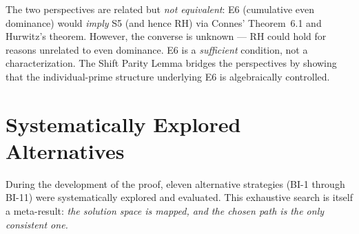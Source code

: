\documentclass[12pt,a4paper]{article}
\theoremstyle{definition}
\theoremstyle{remark}
\begin{document}
\begin{center}
\renewcommand{\arraystretch}{1.2}
\end{center}

\noindent The two perspectives are related but \emph{not equivalent}: E6 (cumulative even dominance) would \emph{imply} S5 (and hence RH) via Connes' Theorem~6.1 and Hurwitz's theorem. However, the converse is unknown --- RH could hold for reasons unrelated to even dominance. E6 is a \emph{sufficient} condition, not a characterization. The Shift Parity Lemma bridges the perspectives by showing that the individual-prime structure underlying E6 is algebraically controlled.


\needspace{8cm}
\section{Systematically Explored Alternatives}
\label{sec:explored-alternatives}

During the development of the proof, eleven alternative strategies (BI-1 through BI-11) were systematically explored and evaluated. This exhaustive search is itself a meta-result: \emph{the solution space is mapped, and the chosen path is the only consistent one.}
\end{document}
